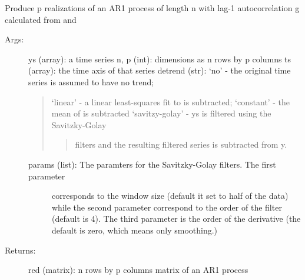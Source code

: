 \documentclass[letterpaper,10pt,english]{sphinxmanual}
\begin{document}
\begin{fulllineitems}
\label{\detokenize{Spectral:pyleoclim.Spectral.ar1_sim}}
Produce p realizations of an AR1 process of length n with lag-1 autocorrelation g calculated from  and 
\begin{description}
\item[{Args:}] \leavevmode
ys (array): a time series
n, p (int): dimensions as n rows by p columns
ts (array): the time axis of that series
detrend (str): ‘no’ - the original time series is assumed to have no trend;
\begin{quote}

‘linear’ - a linear least-squares fit to  is subtracted;
‘constant’ - the mean of  is subtracted
‘savitzy-golay’ - ys is filtered using the Savitzky-Golay
\begin{quote}

filters and the resulting filtered series is subtracted from y.
\end{quote}
\end{quote}
\begin{description}
\item[{params (list): The paramters for the Savitzky-Golay filters. The first parameter}] \leavevmode
corresponds to the window size (default it set to half of the data)
while the second parameter correspond to the order of the filter
(default is 4). The third parameter is the order of the derivative
(the default is zero, which means only smoothing.)

\end{description}

\item[{Returns:}] \leavevmode
red (matrix): n rows by p columns matrix of an AR1 process

\end{description}

\end{fulllineitems}

\end{document}
